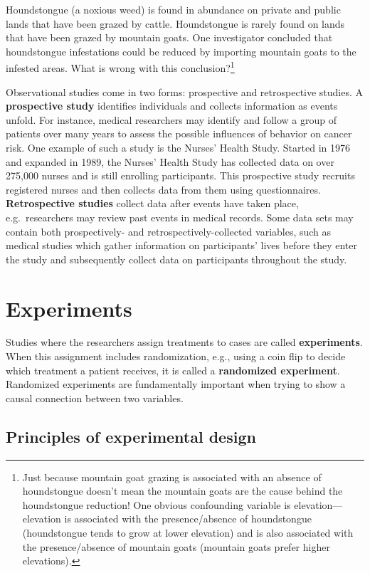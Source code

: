 \documentclass[
  10pt,
  openany]{book}
\theoremstyle{definition}
\theoremstyle{definition}
\theoremstyle{definition}
\theoremstyle{definition}
\theoremstyle{remark}
\begin{document}
Houndstongue (a noxious weed) is found in abundance on private and public lands that have been grazed by cattle. Houndstongue is rarely found on lands that have been grazed by mountain goats. One investigator concluded that houndstongue infestations could be reduced by importing mountain goats to the infested areas. What is wrong with this conclusion?\footnote{Just because mountain goat grazing is associated with an absence of houndstongue doesn't mean the mountain goats are the cause behind the houndstongue reduction! One obvious confounding variable is elevation---elevation is associated with the presence/absence of houndstongue (houndstongue tends to grow at lower elevation) and is also associated with the presence/absence of mountain goats (mountain goats prefer higher elevations).}

Observational studies come in two forms: prospective and retrospective studies.
A \textbf{prospective study} identifies individuals and collects information as events unfold.
For instance, medical researchers may identify and follow a group of patients over many years to assess the possible influences of behavior on cancer risk.
One example of such a study is the Nurses' Health Study.
Started in 1976 and expanded in 1989, the Nurses' Health Study has collected data on over 275,000 nurses and is still enrolling participants.
This prospective study recruits registered nurses and then collects data from them using questionnaires.
\textbf{Retrospective studies} collect data after events have taken place, e.g.~researchers may review past events in medical records.
Some data sets may contain both prospectively- and retrospectively-collected variables, such as medical studies which gather information on participants' lives before they enter the study and subsequently collect data on participants throughout the study.

\section{Experiments}\label{experiments}

Studies where the researchers assign treatments to cases are called \textbf{experiments}.
When this assignment includes randomization, e.g., using a coin flip to decide which treatment a patient receives, it is called a \textbf{randomized experiment}.
Randomized experiments are fundamentally important when trying to show a causal connection between two variables.

\subsection{Principles of experimental design}\label{principles-of-experimental-design}
\end{document}
